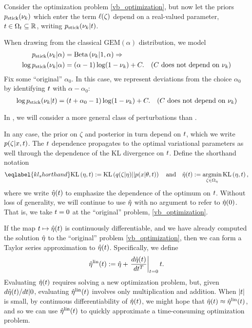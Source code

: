 Consider the optimization problem \eqref{vb_optimization}, but now let the
priors $p_{\mathrm{stick}}(\nu_{k})$ which enter the term $\ell(\zeta)$ depend on a
real-valued parameter, $t \in \Omega_{t} \subseteq \mathbb{R}$, writing
$p_{\mathrm{stick}}(\nu_{k} \vert t)$.

\begin{ex}
%
When drawing from the classical $\mathrm{GEM}(\alpha)$ distribution, we
model
%
\begin{align*}
%
\pstick(\nuk \vert \alpha) ={}&
    \betadist{\nuk \vert 1, \alpha} \Rightarrow\\
\log \pstick(\nuk \vert \alpha) ={}&
    (\alpha - 1) \log(1 - \nuk) + \const. &
    \constdesc{\nuk}
%
\end{align*}
%
Fix some ``original'' $\alpha_0$.  In this case, we represent deviations from the
choice $\alpha_0$ by identifying $t$ with $\alpha - \alpha_0$:
%
\begin{align*}
%
\log \pstick(\nuk \vert \t) ={}&
    (\t + \alpha_0 - 1) \log(1 - \nuk) + \const. &
    \constdesc{\nuk}
%
\end{align*}
%
\end{ex}

In , we will consider a more general class of
perturbations than .

In any case, the prior on $\zeta$ and posterior in turn depend on $t$, which we
write $p(\zeta \vert x, t)$. The $t$ dependence propagates to the optimal
variational parameters as well through the dependence of the KL divergence on
$t$.  Define the shorthand notation
%
\begin{align}\eqlabel{kl_shorthand}
%
\KL{\eta, \t} := \KL{\q(\zeta \vert \eta) || p(\x \vert \theta, \t)}
\mathand
\etaopt(\t) := \argmin_{\zeta \in \etadom} \KL{\eta, \t},
%
\end{align}
%
where we write $\hat\eta(t)$ to emphasize the dependence of the optimum on $t$.
Without loss of generality, we will continue to use $\hat\eta$ with no argument
to refer to $\hat\eta(0)$.  That is, we take $t = 0$ at the ``original''
problem, \eqref{vb_optimization}.

If the map $t \mapsto \hat\eta(t)$ is continuously differentiable, and we have
already computed the solution $\hat\eta$ to the ``original'' problem
\eqref{vb_optimization}, then we can form a Taylor series
approximation to $\hat\eta(t)$.  Specifically, we define
%
\begin{align*}
%
\etalin(\t) := \etaopt + \fracat{d \etaopt(\t)}{d \t^T}{\t=0} \t .
%
\end{align*}
%
Evaluating $\hat\eta(t)$ requires solving a new optimization problem, but, given
$d\hat\eta(t) / dt | 0$, evaluating $\hat\eta^{\mathrm{lin}}(t)$ involves only
multiplication and addition.  When $|t|$ is small, by continuous
differentiability of $\hat\eta(t)$, we might hope that $\hat\eta(t) \approx
\hat\eta^{\mathrm{lin}}(t)$, and so we can use $\hat\eta^{\mathrm{lin}}(t)$ to quickly approximate a
time-consuming optimization problem.

